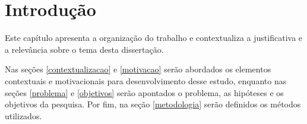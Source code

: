 \chapter{Introdução}
\label{chap:intro}

Este capítulo apresenta a organização do trabalho e contextualiza a justificativa e a relevância sobre o tema desta dissertação. 

 

Nas seções \ref{contextualizacao} e \ref{motivacao} serão abordados os elementos contextuais e motivacionais para desenvolvimento desse estudo, enquanto nas seções \ref{problema} e \ref{objetivos} serão apontados o problema, as hipóteses e os objetivos da pesquisa. Por fim, na seção \ref{metodologia} serão definidos os métodos utilizados.


 

 
  
  
 
 
      
 
 
% 
 
% 

%

%

%  
